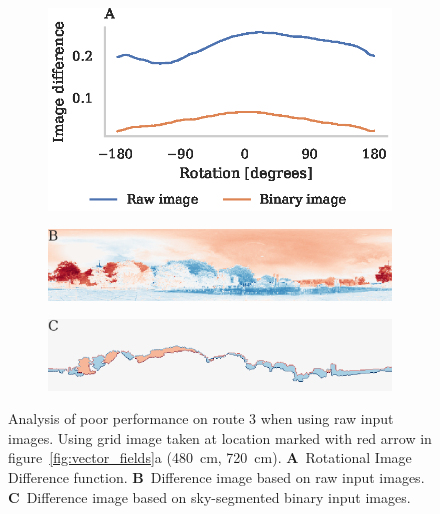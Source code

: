\documentclass[letterpaper]{article}
\begin{document}
\begin{figure}[t]
    \begin{subfigure}[b]{\columnwidth}
        \includegraphics[width=\columnwidth]{figures/route3_ridf.eps}
    \end{subfigure}
    \begin{subfigure}[b]{\columnwidth}
        \includegraphics[width=\columnwidth]{figures/route3_unwrapped_image_diff.png}
    \end{subfigure}
    \begin{subfigure}[b]{\columnwidth}
        \includegraphics[width=\columnwidth]{figures/route3_mask_image_diff.png}
    \end{subfigure}
    \caption{Analysis of poor performance on route 3 when using raw input images.
    Using grid image taken at location marked with red arrow in figure~\ref{fig:vector_fields}a (\SI{480}{\centi\metre}, \SI{720}{\centi\metre}).
    \textbf{A}~Rotational Image Difference function.
    \textbf{B}~Difference image based on raw input images.
    \textbf{C}~Difference image based on sky-segmented binary input images.}
    \label{fig:light_level}
\end{figure}
\end{document}
